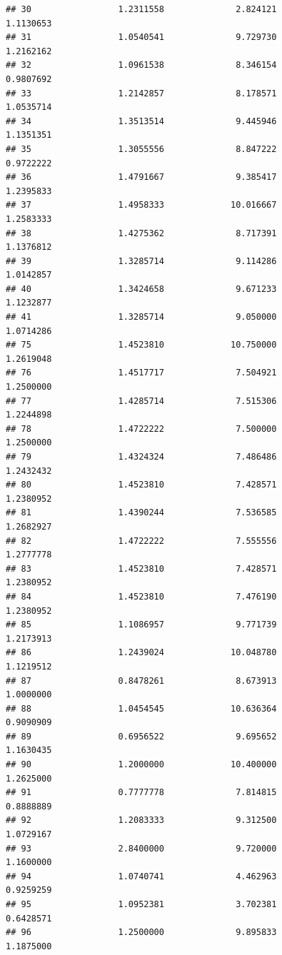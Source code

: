 \documentclass[]{article}
\begin{document}
\begin{verbatim}
## 30                 1.2311558              2.824121               1.1130653
## 31                 1.0540541              9.729730               1.2162162
## 32                 1.0961538              8.346154               0.9807692
## 33                 1.2142857              8.178571               1.0535714
## 34                 1.3513514              9.445946               1.1351351
## 35                 1.3055556              8.847222               0.9722222
## 36                 1.4791667              9.385417               1.2395833
## 37                 1.4958333             10.016667               1.2583333
## 38                 1.4275362              8.717391               1.1376812
## 39                 1.3285714              9.114286               1.0142857
## 40                 1.3424658              9.671233               1.1232877
## 41                 1.3285714              9.050000               1.0714286
## 75                 1.4523810             10.750000               1.2619048
## 76                 1.4517717              7.504921               1.2500000
## 77                 1.4285714              7.515306               1.2244898
## 78                 1.4722222              7.500000               1.2500000
## 79                 1.4324324              7.486486               1.2432432
## 80                 1.4523810              7.428571               1.2380952
## 81                 1.4390244              7.536585               1.2682927
## 82                 1.4722222              7.555556               1.2777778
## 83                 1.4523810              7.428571               1.2380952
## 84                 1.4523810              7.476190               1.2380952
## 85                 1.1086957              9.771739               1.2173913
## 86                 1.2439024             10.048780               1.1219512
## 87                 0.8478261              8.673913               1.0000000
## 88                 1.0454545             10.636364               0.9090909
## 89                 0.6956522              9.695652               1.1630435
## 90                 1.2000000             10.400000               1.2625000
## 91                 0.7777778              7.814815               0.8888889
## 92                 1.2083333              9.312500               1.0729167
## 93                 2.8400000              9.720000               1.1600000
## 94                 1.0740741              4.462963               0.9259259
## 95                 1.0952381              3.702381               0.6428571
## 96                 1.2500000              9.895833               1.1875000

\end{verbatim}
\end{document}

